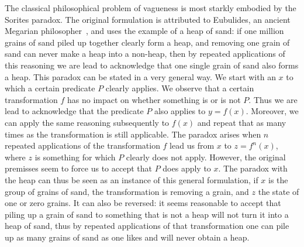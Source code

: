 \documentclass[a4paper]{article}
\begin{document}
The classical philosophical problem of vagueness is most starkly embodied by the Sorites paradox.
The original formulation is attributed to Eubulides, an ancient Megarian philosopher~\parencite{sorensen_sorites_2009}, and uses the example of a heap of sand: if one million grains of sand piled up together clearly form a heap, and removing one grain of sand can never make a heap into a non-heap, then by repeated applications of this reasoning we are lead to acknowledge that one single grain of sand also forms a heap.
This paradox can be stated in a very general way.
We start with an $x$ to which a certain predicate $P$ clearly applies.
We observe that a certain transformation $f$ has no impact on whether something is or is not $P$.
Thus we are lead to acknowledge that the predicate $P$ also applies to $y = f(x)$.
Moreover, we can apply the same reasoning subsequently to $f(x)$ and repeat that as many times as the transformation is still applicable.
The paradox arises when $n$ repeated applications of the transformation $f$ lead us from $x$ to $z = f^n(x)$, where $z$ is something for which $P$ clearly does not apply.
However, the original premisses seem to force us to accept that $P$ does apply to $x$.
The paradox with the heap can thus be seen as an instance of this general formulation, if $x$ is the group of grains of sand, the transformation is removing a grain, and $z$ the state of one or zero grains.
It can also be reversed: it seems reasonable to accept that piling up a grain of sand to something that is not a heap will not turn it into a heap of sand, thus 
by repeated applications of that transformation one can pile up as many grains of sand as one likes and will never obtain a heap.
\end{document}
